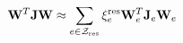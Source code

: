 \documentclass[preview]{standalone}
\begin{document}
\begin{align*}
\special{dvisvgm:raw <g id='unique000'>}\mathbf W^T\mathbf J\mathbf W \special{dvisvgm:raw </g>}\special{dvisvgm:raw <g id='unique001'>}\approx\sum_{e\in\mathcal Z_{\rm res}}\xi_e^{\rm res}\mathbf W_e^T\mathbf J_e\mathbf W_e\special{dvisvgm:raw </g>}
\end{align*}
\end{document}
